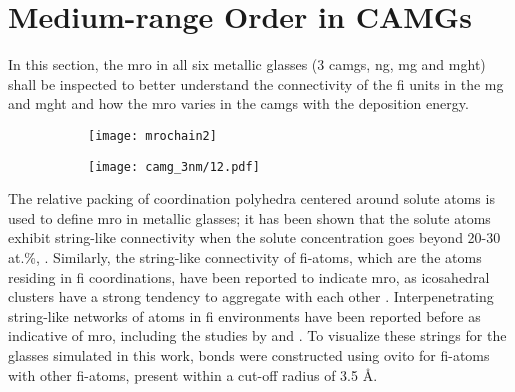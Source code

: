 %
\section{Medium-range Order in CAMGs}

\begin{changebar}
In this section, the \gls{mro} in all six metallic glasses (3 \gls{camg}s, \gls{ng}, \gls{mg} and \gls{mght}) shall be inspected to better understand the connectivity of the \gls{fi} units in the \gls{mg} and \gls{mght} and how the \gls{mro} varies in the \gls{camg}s with the deposition energy. \par

\begin{figure}[!h]
	\centering
	\begin{subfigure}[b]{0.5\textwidth} \centering
		\texttt{[image: mrochain2]}	\subcaption{}
	\end{subfigure}%
	\vfill
	\begin{subfigure}{\textwidth} \centering
		\texttt{[image: camg\_3nm/12.pdf]}	\subcaption{}
	\end{subfigure}%
	\label{f:mro-alt_camg}
\end{figure}

The relative packing of coordination polyhedra centered around solute atoms is used to define \gls{mro} in metallic glasses; it has been shown that the solute atoms exhibit string-like connectivity when the solute concentration goes beyond 20-30 at.\%, \cite{Sheng2006}. Similarly, the string-like connectivity of \gls{fi}-atoms, which are the atoms residing in \gls{fi} coordinations, have been reported to indicate \gls{mro}, as icosahedral  clusters have a strong tendency to aggregate with each other \cite{Bernal1959,Miracle2004,Li2008}. Interpenetrating string-like networks of atoms in \gls{fi} environments have been reported before as indicative of \gls{mro}, including the studies by \textcite{Lee2011} and \textcite{Ritter2011}. To visualize these strings for the glasses simulated in this work, bonds were constructed  using \gls{ovito} for \gls{fi}-atoms with other \gls{fi}-atoms, present within a cut-off radius of 3.5 \r{A}. \par 
\end{changebar}


